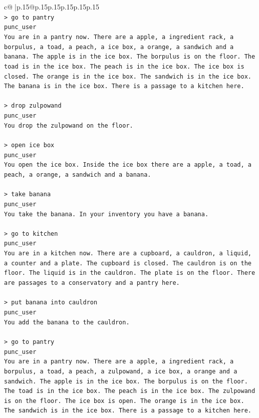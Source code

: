 \documentclass{article}
\begin{document}
{\begin{supertabular}{c@{$\;$}|p{.15\linewidth}@{}p{.15\linewidth}p{.15\linewidth}p{.15\linewidth}p{.15\linewidth}p{.15\linewidth}}
{{{\\ 
\texttt{> go to pantry} \\
\texttt{punc\_user} \\
\texttt{You are in a pantry now. There are a apple, a ingredient rack, a borpulus, a toad, a peach, a ice box, a orange, a sandwich and a banana. The apple is in the ice box. The borpulus is on the floor. The toad is in the ice box. The peach is in the ice box. The ice box is closed. The orange is in the ice box. The sandwich is in the ice box. The banana is in the ice box. There is a passage to a kitchen here.} \\
\\ 
\texttt{> drop zulpowand} \\
\texttt{punc\_user} \\
\texttt{You drop the zulpowand on the floor.} \\
\\ 
\texttt{> open ice box} \\
\texttt{punc\_user} \\
\texttt{You open the ice box. Inside the ice box there are a apple, a toad, a peach, a orange, a sandwich and a banana.} \\
\\ 
\texttt{> take banana} \\
\texttt{punc\_user} \\
\texttt{You take the banana. In your inventory you have a banana.} \\
\\ 
\texttt{> go to kitchen} \\
\texttt{punc\_user} \\
\texttt{You are in a kitchen now. There are a cupboard, a cauldron, a liquid, a counter and a plate. The cupboard is closed. The cauldron is on the floor. The liquid is in the cauldron. The plate is on the floor. There are passages to a conservatory and a pantry here.} \\
\\ 
\texttt{> put banana into cauldron} \\
\texttt{punc\_user} \\
\texttt{You add the banana to the cauldron.} \\
\\ 
\texttt{> go to pantry} \\
\texttt{punc\_user} \\
\texttt{You are in a pantry now. There are a apple, a ingredient rack, a borpulus, a toad, a peach, a zulpowand, a ice box, a orange and a sandwich. The apple is in the ice box. The borpulus is on the floor. The toad is in the ice box. The peach is in the ice box. The zulpowand is on the floor. The ice box is open. The orange is in the ice box. The sandwich is in the ice box. There is a passage to a kitchen here.} \\
}}}
\end{supertabular}}
\end{document}
